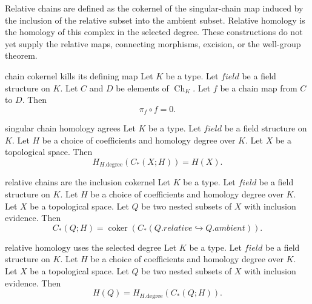 Relative chains are defined as the cokernel of the singular-chain map induced
by the inclusion of the relative subset into the ambient subset.
Relative homology is the homology of this complex in the selected degree.
These constructions do not yet supply the relative maps, connecting morphisms,
excision, or the well-group theorem.

\begin{cleanresult}{chain cokernel kills its defining map}
Let $K$ be a type.
Let $\mathit{field}$ be a field structure on $K$.
Let $C$ and $D$ be elements of $\operatorname{Ch}_{K}$.
Let $f$ be a chain map from $C$ to $D$.
Then \[\pi_{f}\circ f=0.\]
\par{}
\end{cleanresult}

\begin{cleanresult}{singular chain homology agrees}
Let $K$ be a type.
Let $\mathit{field}$ be a field structure on $K$.
Let $H$ be a choice of coefficients and homology degree over $K$.
Let $X$ be a topological space.
Then \[H_{H.\mathrm{degree}}(C_*(X;H))=H(X).\]
\end{cleanresult}

\begin{cleanresult}{relative chains are the inclusion cokernel}
Let $K$ be a type.
Let $\mathit{field}$ be a field structure on $K$.
Let $H$ be a choice of coefficients and homology degree over $K$.
Let $X$ be a topological space.
Let $Q$ be two nested subsets of $X$ with inclusion evidence.
Then \[C_*(Q;H)=\operatorname{coker}(C_*(Q.relative\hookrightarrow Q.ambient)).\]
\end{cleanresult}

\begin{cleanresult}{relative homology uses the selected degree}
Let $K$ be a type.
Let $\mathit{field}$ be a field structure on $K$.
Let $H$ be a choice of coefficients and homology degree over $K$.
Let $X$ be a topological space.
Let $Q$ be two nested subsets of $X$ with inclusion evidence.
Then \[H(Q)=H_{H.\mathrm{degree}}(C_*(Q;H)).\]
\end{cleanresult}

